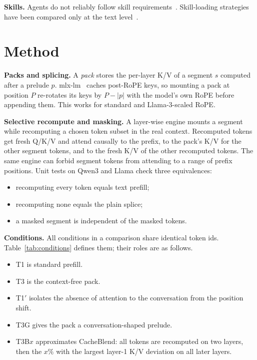 \documentclass[10pt]{article}
\newcommand{\cond}[1]{\textsf{#1}}
\begin{document}
\textbf{Skills.} Agents do not reliably follow skill requirements~\citep{li2026hexis}. Skill-loading strategies have been compared
only at the text level~\citep{zhang2026progressive,nakasuji2026skillblocks}.

\section{Method}\label{sec:method}
\textbf{Packs and splicing.} A \emph{pack} stores the per-layer K/V of a segment $s$ computed after a prelude $p$.
mlx-lm~\citep{hannun2023mlx} caches post-RoPE keys, so mounting a pack at position $P$ re-rotates its keys by $P-|p|$ with the
model's own RoPE before appending them. This works for standard and Llama-3-scaled RoPE.

\textbf{Selective recompute and masking.} A layer-wise engine mounts a segment while recomputing a chosen token subset in the real
context. Recomputed tokens get fresh Q/K/V and attend causally to the prefix, to the pack's K/V for the other segment tokens, and to
the fresh K/V of the other recomputed tokens. The same engine can forbid segment tokens from attending to a range of prefix
positions. Unit tests on Qwen3 and Llama check three equivalences:
\begin{itemize}
\item recomputing every token equals text prefill;
\item recomputing none equals the plain splice;
\item a masked segment is independent of the masked tokens.
\end{itemize}

\textbf{Conditions.} All conditions in a comparison share identical token ids. Table~\ref{tab:conditions} defines them; their roles
are as follows.
\begin{itemize}
\item \cond{T1} is standard prefill.
\item \cond{T3} is the context-free pack.
\item \cond{T1$'$} isolates the absence of attention to the conversation from the position shift.
\item \cond{T3G} gives the pack a conversation-shaped prelude.
\item \cond{T3B$x$} approximates CacheBlend: all tokens are recomputed on two layers, then the $x\%$ with the largest layer-1 K/V
  deviation on all later layers.
\end{itemize}
\end{document}
